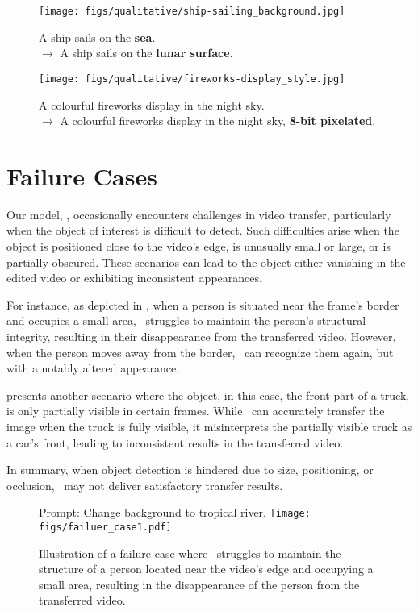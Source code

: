 \begin{figure}
    \centering
    \texttt{[image: figs/qualitative/ship-sailing\_background.jpg]}
    \caption{A ship sails on the \textbf{sea}. \\ $\rightarrow$ A ship sails on the \textbf{lunar surface}.}
    \label{fig.additional_qua8}
\end{figure}

\begin{figure}
    \centering
    \texttt{[image: figs/qualitative/fireworks-display\_style.jpg]}
    \caption{A colourful fireworks display in the night sky. \\ $\rightarrow$ A colourful fireworks display in the night sky, \textbf{8-bit pixelated}.}
    \label{fig.additional_qua9}
\end{figure}

\section{Failure Cases}
Our model, \ours, occasionally encounters challenges in video transfer, particularly when the object of interest is difficult to detect. Such difficulties arise when the object is positioned close to the video's edge, is unusually small or large, or is partially obscured. These scenarios can lead to the object either vanishing in the edited video or exhibiting inconsistent appearances.

For instance, as depicted in , when a person is situated near the frame's border and occupies a small area, \ours\ struggles to maintain the person's structural integrity, resulting in their disappearance from the transferred video. However, when the person moves away from the border, \ours\ can recognize them again, but with a notably altered appearance.

 presents another scenario where the object, in this case, the front part of a truck, is only partially visible in certain frames. While \ours\ can accurately transfer the image when the truck is fully visible, it misinterprets the partially visible truck as a car's front, leading to inconsistent results in the transferred video.

In summary, when object detection is hindered due to size, positioning, or occlusion, \ours\ may not deliver satisfactory transfer results.

\begin{figure}
    \centering
    Prompt: Change background to tropical river.
    \texttt{[image: figs/failuer\_case1.pdf]}
    \caption{Illustration of a failure case where \ours\ struggles to maintain the structure of a person located near the video's edge and occupying a small area, resulting in the disappearance of the person from the transferred video.}
    \label{fig.failure1}
\end{figure}

